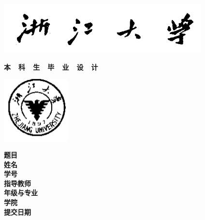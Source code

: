 {
  \setlength{\parindent}{0em}

  {
    \linespread{1}

    \vspace*{-1em}

    \begin{center}
      \includegraphics[width=108mm]{data/cover-zh/xiaoming}
    \end{center}

    \vspace{-1.5em}

    {
      \songti\erhao\bfseries
      \centering
      本~~科~~生~~毕~~业~~设~~计 \par
    }

    \vspace{1em}

    \begin{center}
      \includegraphics[width=35mm]{data/cover-zh/xiaobiao}
    \end{center}
  }

  \vspace{9em}

  {
    \linespread{1.6}
    \songti\sanhao\bfseries
    \centering
    \newlength{\titlelength}
    \setlength{\titlelength}{22em}
    题目 \; \underline{\makebox[\titlelength]{\zjutitlec}} \\
    姓名 \; \underline{\makebox[\titlelength]{\zjuauthornamec}} \\
    学号 \; \underline{\makebox[\titlelength]{\zjuauthorid}} \\
    指导教师 \; \underline{\makebox[\titlelength - 2em]{\zjumentorc}} \\
    年级与专业 \; \underline{\makebox[\titlelength - 3em]{\zjugrade \; \zjumajorc}} \\
    学院 \; \underline{\makebox[\titlelength]{\zjucollegec}} \\
    提交日期 \; \underline{\makebox[\titlelength - 2em]{\zjudatec}} \par
  }
}
